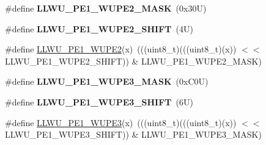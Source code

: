\begin{DoxyCompactItemize}
\mbox{\label{group___l_l_w_u___register___masks_ga97e8e2fc8ce673f6b4625d307bc94b4a}} 
\#define {\bfseries L\+L\+W\+U\+\_\+\+P\+E1\+\_\+\+W\+U\+P\+E2\+\_\+\+M\+A\+SK}~(0x30\+U)
\item 
\mbox{\label{group___l_l_w_u___register___masks_ga0b1bb86eb31a82a18ad1491b0305000b}} 
\#define {\bfseries L\+L\+W\+U\+\_\+\+P\+E1\+\_\+\+W\+U\+P\+E2\+\_\+\+S\+H\+I\+FT}~(4\+U)
\item 
\#define \mbox{\hyperlink{group___l_l_w_u___register___masks_gae6a462624a848afff074ae6e6da83cb0}{L\+L\+W\+U\+\_\+\+P\+E1\+\_\+\+W\+U\+P\+E2}}(x)~(((uint8\+\_\+t)(((uint8\+\_\+t)(x)) $<$$<$ L\+L\+W\+U\+\_\+\+P\+E1\+\_\+\+W\+U\+P\+E2\+\_\+\+S\+H\+I\+FT)) \& L\+L\+W\+U\+\_\+\+P\+E1\+\_\+\+W\+U\+P\+E2\+\_\+\+M\+A\+SK)
\item 
\mbox{\label{group___l_l_w_u___register___masks_ga44cae929b3178e210eb5e1346a4ce997}} 
\#define {\bfseries L\+L\+W\+U\+\_\+\+P\+E1\+\_\+\+W\+U\+P\+E3\+\_\+\+M\+A\+SK}~(0x\+C0\+U)
\item 
\mbox{\label{group___l_l_w_u___register___masks_gaceee1b1b6323ba4d33abf875718e885a}} 
\#define {\bfseries L\+L\+W\+U\+\_\+\+P\+E1\+\_\+\+W\+U\+P\+E3\+\_\+\+S\+H\+I\+FT}~(6\+U)
\item 
\#define \mbox{\hyperlink{group___l_l_w_u___register___masks_ga3dfb03917664cd276f352b77e95624b9}{L\+L\+W\+U\+\_\+\+P\+E1\+\_\+\+W\+U\+P\+E3}}(x)~(((uint8\+\_\+t)(((uint8\+\_\+t)(x)) $<$$<$ L\+L\+W\+U\+\_\+\+P\+E1\+\_\+\+W\+U\+P\+E3\+\_\+\+S\+H\+I\+FT)) \& L\+L\+W\+U\+\_\+\+P\+E1\+\_\+\+W\+U\+P\+E3\+\_\+\+M\+A\+SK)
\end{DoxyCompactItemize}

